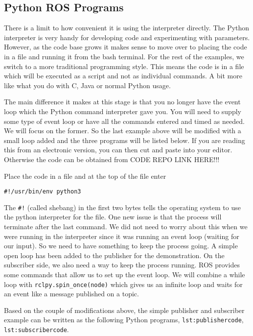 \hypertarget{python-ros-programs}{%
\subsection{Python ROS Programs}\label{python-ros-programs}}

There is a limit to how convenient it is using the interpreter directly.
The Python interpreter is very handy for developing code and
experimenting with parameters. However, as the code base grows it makes
sense to move over to placing the code in a file and running it from the
bash terminal. For the rest of the examples, we switch to a more
traditional programming style. This means the code is in a file which
will be executed as a script and not as individual commands. A bit more
like what you do with C, Java or normal Python usage.

The main difference it makes at this stage is that you no longer have
the event loop which the Python command interpreter gave you. You will
need to supply some type of event loop or have all the commands entered
and timed as needed. We will focus on the former. So the last example
above will be modified with a small loop added and the three programs
will be listed below. If you are reading this from an electronic
version, you can then cut and paste into your editor. Otherwise the code
can be obtained from CODE REPO LINK HERE!!!

Place the code in a file and at the top of the file enter

\begin{verbatim}
#!/usr/bin/env python3
\end{verbatim}

The \texttt{\#!} (called shebang) in the first two bytes tells the
operating system to use the python interpreter for the file. One new
issue is that the process will terminate after the last command. We did
not need to worry about this when we were running in the interpreter
since it was running an event loop (waiting for our input). So we need
to have something to keep the process going. A simple open loop has been
added to the publisher for the demonstration. On the subscriber side, we
also need a way to keep the process running. ROS provides some commands
that allow us to set up the event loop. We will combine a while loop
with \texttt{rclpy.spin\_once(node)} which gives us an infinite loop and
waits for an event like a message published on a topic.

Based on the couple of modifications above, the simple publisher and
subscriber example can be written as the following Python programs,
\texttt{lst:publishercode}, \texttt{lst:subscribercode}.

